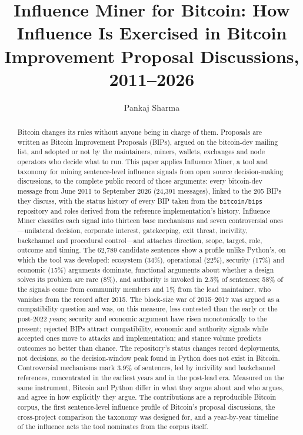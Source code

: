\documentclass[sigconf,screen]{acmart}
\begin{document}
\title[Influence Miner for Bitcoin]{Influence Miner for Bitcoin: How Influence Is Exercised in Bitcoin Improvement Proposal Discussions, 2011--2026}

\author{Pankaj Sharma}

\renewcommand{\shortauthors}{Sharma}

\begin{abstract}
Bitcoin changes its rules without anyone being in charge of them. Proposals are written as Bitcoin Improvement Proposals (BIPs), argued on the bitcoin-dev mailing list, and adopted or not by the maintainers, miners, wallets, exchanges and node operators who decide what to run. This paper applies Influence Miner, a tool and taxonomy for mining sentence-level influence signals from open source decision-making discussions, to the complete public record of those arguments: every bitcoin-dev message from June 2011 to September 2026 (24,391 messages), linked to the 205 BIPs they discuss, with the status history of every BIP taken from the \texttt{bitcoin/bips} repository and roles derived from the reference implementation's history. Influence Miner classifies each signal into thirteen base mechanisms and seven controversial ones---unilateral decision, corporate interest, gatekeeping, exit threat, incivility, backchannel and procedural control---and attaches direction, scope, target, role, outcome and timing. The 62,789 candidate sentences show a profile unlike Python's, on which the tool was developed: ecosystem (34\%), operational (22\%), security (17\%) and economic (15\%) arguments dominate, functional arguments about whether a design solves its problem are rare (8\%), and authority is invoked in 2.5\% of sentences; 58\% of the signals come from community members and 1\% from the lead maintainer, who vanishes from the record after 2015. The block-size war of 2015--2017 was argued as a compatibility question and was, on this measure, less contested than the early or the post-2022 years; security and economic argument have risen monotonically to the present; rejected BIPs attract compatibility, economic and authority signals while accepted ones move to attacks and implementation; and stance volume predicts outcomes no better than chance. The repository's status changes record deployments, not decisions, so the decision-window peak found in Python does not exist in Bitcoin. Controversial mechanisms mark 3.9\% of sentences, led by incivility and backchannel references, concentrated in the earliest years and in the post-lead era. Measured on the same instrument, Bitcoin and Python differ in what they argue about and who argues, and agree in how explicitly they argue. The contributions are a reproducible Bitcoin corpus, the first sentence-level influence profile of Bitcoin's proposal discussions, the cross-project comparison the taxonomy was designed for, and a year-by-year timeline of the influence acts the tool nominates from the corpus itself.
\end{abstract}
\end{document}
